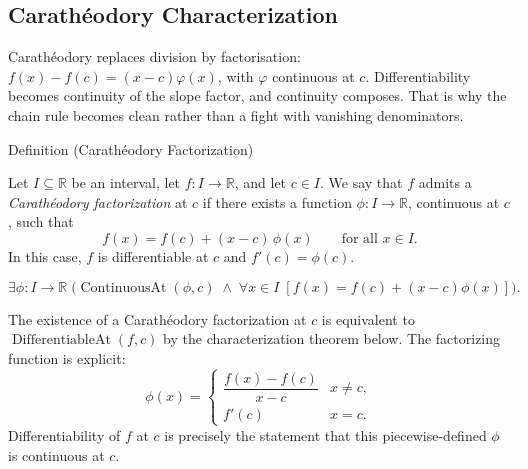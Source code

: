 \subsection{Carath\'{e}odory Characterization}


\begin{remark*}
Carath\'{e}odory replaces division by factorisation:
\(f(x)-f(c)=(x-c)\varphi(x)\), with \(\varphi\) continuous at \(c\).
Differentiability becomes continuity of the slope factor, and continuity
composes. That is why the chain rule becomes clean rather than a fight with
vanishing denominators.
\end{remark*}

\begin{definitionbox}{Definition (Carath\'{e}odory Factorization)}
\begin{definition}
\label{def:caratheodory-factorization}
Let $I \subseteq \mathbb{R}$ be an interval, let $f : I \to \mathbb{R}$, and let $c \in I$. We say that $f$ admits a \emph{Carath\'{e}odory factorization} at $c$ if there exists a function $\phi : I \to \mathbb{R}$, continuous at $c$, such that
\[
f(x) = f(c) + (x-c)\,\phi(x) \qquad \text{for all } x \in I.
\]
In this case, $f$ is differentiable at $c$ and $f'(c) = \phi(c)$.
\end{definition}
\end{definitionbox}

\begin{remark*}
\[
\exists \phi : I \to \mathbb{R}\;
\bigl(\operatorname{ContinuousAt}(\phi,c)
\;\land\;
\forall x \in I\;[f(x) = f(c)+(x-c)\phi(x)]\bigr).
\]
\end{remark*}

\begin{remark*}
The existence of a Carath\'{e}odory factorization at $c$ is equivalent to $\operatorname{DifferentiableAt}(f,c)$ by the characterization theorem below. The factorizing function is explicit:
\[
\phi(x) =
\begin{cases}
\dfrac{f(x)-f(c)}{x-c} & x \neq c, \\[6pt]
f'(c) & x = c.
\end{cases}
\]
Differentiability of $f$ at $c$ is precisely the statement that this piecewise-defined $\phi$ is continuous at $c$.
\end{remark*}

